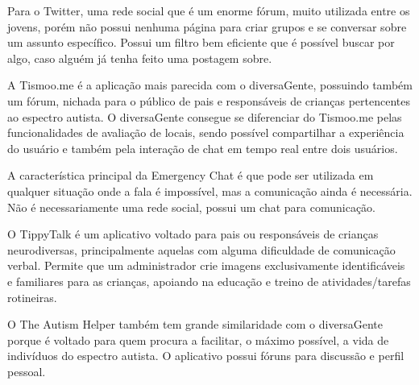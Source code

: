 Para o Twitter, uma rede social que é um enorme fórum, muito utilizada entre os jovens, porém não possui nenhuma página para criar grupos e se conversar sobre um assunto específico. Possui um filtro bem eficiente que é possível buscar por algo, caso alguém já tenha feito uma postagem sobre. 

A Tismoo.me é a aplicação mais parecida com o diversaGente, possuindo também um fórum, nichada para o público de pais e responsáveis de crianças pertencentes ao espectro autista. O diversaGente consegue se diferenciar do Tismoo.me pelas funcionalidades de avaliação de locais, sendo possível compartilhar a experiência do usuário e também pela interação de chat em tempo real entre dois usuários. 

A característica principal da Emergency Chat é que pode ser utilizada em qualquer situação onde a fala é impossível, mas a comunicação ainda é necessária. Não é necessariamente uma rede social, possui um chat para comunicação.  

O TippyTalk é um aplicativo voltado para pais ou responsáveis de crianças neurodiversas, principalmente aquelas com alguma dificuldade de comunicação verbal. Permite que um administrador crie imagens exclusivamente identificáveis e familiares para as crianças, apoiando na educação e treino de atividades/tarefas rotineiras. 

O The Autism Helper também tem grande similaridade com o diversaGente porque é voltado para quem procura a facilitar, o máximo possível, a vida de indivíduos do espectro autista. O aplicativo possui fóruns para discussão e perfil pessoal. 



